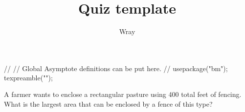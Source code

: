 \documentclass[addpoints, 12pt]{exam}
\title{Quiz template}
\author{Wray}
\begin{document}
\begin{asydef}
//
// Global Asymptote definitions can be put here.
//
usepackage("bm");
texpreamble("\def\V#1{\bm{#1}}");
\end{asydef}



\bigskip

             
\bigskip
\bigskip
\begin{questions}

\question[20]
A farmer wants to enclose a rectangular pasture using 400 total feet of fencing.  What is the largest area that can be enclosed by a fence of this type?

\end{questions}
\end{document}
